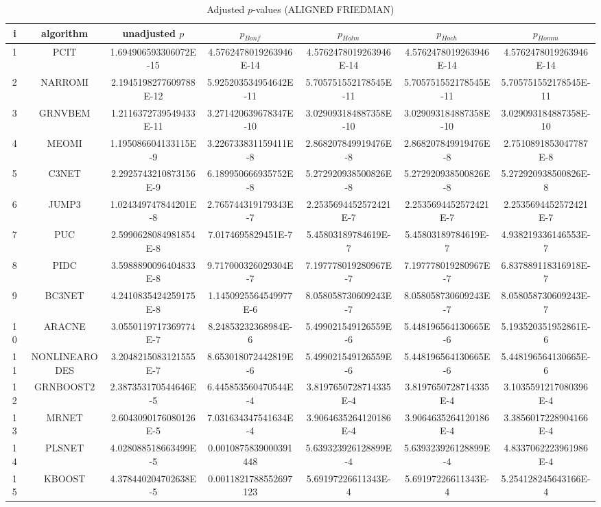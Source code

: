 \documentclass[a4paper,10pt]{article}
\begin{document}
\begin{landscape}
\begin{table}[!htp]
\centering\scriptsize
\caption{Adjusted $p$-values (ALIGNED FRIEDMAN)}
\begin{tabular}{ccccccc}
i&algorithm&unadjusted $p$&$p_{Bonf}$&$p_{Holm}$&$p_{Hoch}$&$p_{Homm}$\\
\hline
1&PCIT&1.694906593306072E-15&4.5762478019263946E-14&4.5762478019263946E-14&4.5762478019263946E-14&4.5762478019263946E-14\\
2&NARROMI&2.1945198277609788E-12&5.925203534954642E-11&5.705751552178545E-11&5.705751552178545E-11&5.705751552178545E-11\\
3&GRNVBEM&1.2116372739549433E-11&3.271420639678347E-10&3.029093184887358E-10&3.029093184887358E-10&3.029093184887358E-10\\
4&MEOMI&1.195086604133115E-9&3.226733831159411E-8&2.868207849919476E-8&2.868207849919476E-8&2.7510891853047787E-8\\
5&C3NET&2.2925743210873156E-9&6.189950666935752E-8&5.272920938500826E-8&5.272920938500826E-8&5.272920938500826E-8\\
6&JUMP3&1.024349747844201E-8&2.765744319179343E-7&2.2535694452572421E-7&2.2535694452572421E-7&2.2535694452572421E-7\\
7&PUC&2.5990628084981854E-8&7.0174695829451E-7&5.45803189784619E-7&5.45803189784619E-7&4.938219336146553E-7\\
8&PIDC&3.5988890096404833E-8&9.717000326029304E-7&7.197778019280967E-7&7.197778019280967E-7&6.837889118316918E-7\\
9&BC3NET&4.2410835424259175E-8&1.1450925564549977E-6&8.058058730609243E-7&8.058058730609243E-7&8.058058730609243E-7\\
10&ARACNE&3.0550119717369774E-7&8.24853232368984E-6&5.499021549126559E-6&5.448196564130665E-6&5.193520351952861E-6\\
11&NONLINEARODES&3.2048215083121555E-7&8.653018072442819E-6&5.499021549126559E-6&5.448196564130665E-6&5.448196564130665E-6\\
12&GRNBOOST2&2.387353170544646E-5&6.445853560470544E-4&3.8197650728714335E-4&3.8197650728714335E-4&3.1035591217080396E-4\\
13&MRNET&2.6043090176080126E-5&7.031634347541634E-4&3.9064635264120186E-4&3.9064635264120186E-4&3.3856017228904166E-4\\
14&PLSNET&4.028088518663499E-5&0.0010875839000391448&5.639323926128899E-4&5.639323926128899E-4&4.8337062223961986E-4\\
15&KBOOST&4.378440204702638E-5&0.0011821788552697123&5.69197226611343E-4&5.69197226611343E-4&5.254128245643166E-4\\

\end{tabular}
\end{table}
\end{landscape}
\end{document}
